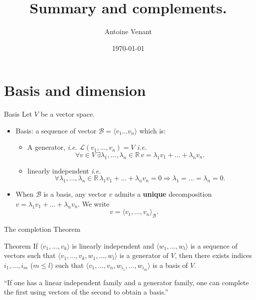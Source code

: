 \documentclass{beamer}
\begin{document}
\title{Summary and complements.} 
\author{Antoine Venant}
\date{\today}

\maketitle


\section{Basis and dimension}

\begin{frame}{Basis}
  Let $V$ be a vector space.

  \begin{itemize}
  \item Basis: a sequence of vector $\mathcal{B} = \langle v_1 \dots v_n \rangle$ which is:
    \begin{itemize}
    \item A generator, \emph{i.e.} $\mathcal{L}(v_1, \dots, v_n ) = V$ \emph{i.e.} \[\forall v \in V\, \exists \lambda_1, \dots, \lambda_n \in \mathbb{R}\, v = \lambda_1 v_1 + \dots + \lambda_n v_n.\]
    \item linearly independent \emph{i.e.} \[\forall \lambda_1,\dots, \lambda_n \in \mathbb{R} \, \lambda_1 v_1 + \dots + \lambda_n v_n = 0 \Rightarrow \lambda_1 = \dots = \lambda_n = 0.\]
    \end{itemize}
  \item When $\mathcal{B}$ is a basis, any vector $v$ admits a {\bf unique} decomposition $v = \lambda_1 v_1 + \dots + \lambda_n v_n$. We write \[v = \langle v_1, \dots, v_n \rangle_{\mathcal{B}}.\]
  \end{itemize}
\end{frame}

\begin{frame}{The completion Theorem}
  \begin{block}{Theorem}
    If $\langle v_1, \dots, v_k \rangle$ is linearly independent and $\langle w_1, \dots, w_l \rangle$ is a sequence of vectors such that $\langle v_1, \dots, v_k, w_1, \dots, w_l \rangle$ is a generator of $V$, then there exists indices $i_1, \dots, i_m$ ($m \le l$) such that $\langle v_1, \dots, v_n, w_{i_1}, \dots, w_{i_m} \rangle$ is a basis of $V$.
  \end{block}

  \alert{``If one has a linear independent family and a generator family, one can complete the first using vectors of the second to obtain a basis.''}
\end{frame}
\end{document}
